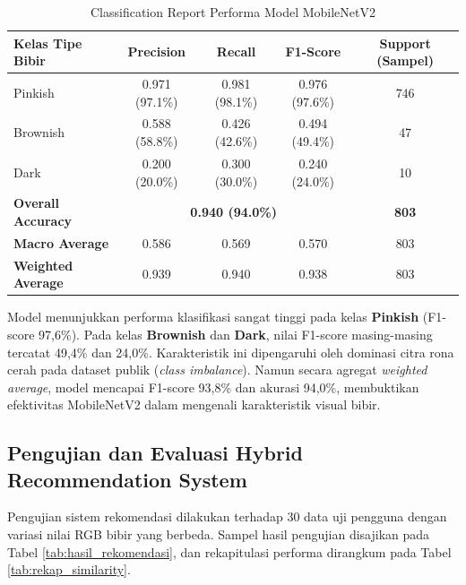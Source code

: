 \documentclass[10pt,a4paper]{article}
\begin{document}
\begin{table}[htbp]
 \centering
 \caption{Classification Report Performa Model MobileNetV2}
 \label{tab:classification_report}
 \fontsize{8.5pt}{11pt}\selectfont
 \begin{tabular}{lcccc}
 \toprule
 \textbf{Kelas Tipe Bibir} & \textbf{Precision} & \textbf{Recall} & \textbf{F1-Score} & \textbf{Support (Sampel)} \\
 \midrule
 Pinkish & 0.971 (97.1\%) & 0.981 (98.1\%) & 0.976 (97.6\%) & 746 \\
 Brownish & 0.588 (58.8\%) & 0.426 (42.6\%) & 0.494 (49.4\%) & 47 \\
 Dark & 0.200 (20.0\%) & 0.300 (30.0\%) & 0.240 (24.0\%) & 10 \\
 \midrule
 \textbf{Overall Accuracy} & \multicolumn{3}{c}{\textbf{0.940 (94.0\%)}} & \textbf{803} \\
 \textbf{Macro Average} & 0.586 & 0.569 & 0.570 & 803 \\
 \textbf{Weighted Average} & 0.939 & 0.940 & 0.938 & 803 \\
 \bottomrule
 \end{tabular}
\end{table}

Model menunjukkan performa klasifikasi sangat tinggi pada kelas \textbf{Pinkish} (F1-score 97,6\%). Pada kelas \textbf{Brownish} dan \textbf{Dark}, nilai F1-score masing-masing tercatat 49,4\% dan 24,0\%. Karakteristik ini dipengaruhi oleh dominasi citra rona cerah pada dataset publik (\textit{class imbalance}). Namun secara agregat \textit{weighted average}, model mencapai F1-score 93,8\% dan akurasi 94,0\%, membuktikan efektivitas MobileNetV2 dalam mengenali karakteristik visual bibir.

\subsection{Pengujian dan Evaluasi Hybrid Recommendation System}
Pengujian sistem rekomendasi dilakukan terhadap 30 data uji pengguna dengan variasi nilai RGB bibir yang berbeda. Sampel hasil pengujian disajikan pada Tabel \ref{tab:hasil_rekomendasi}, dan rekapitulasi performa dirangkum pada Tabel \ref{tab:rekap_similarity}.
\end{document}
